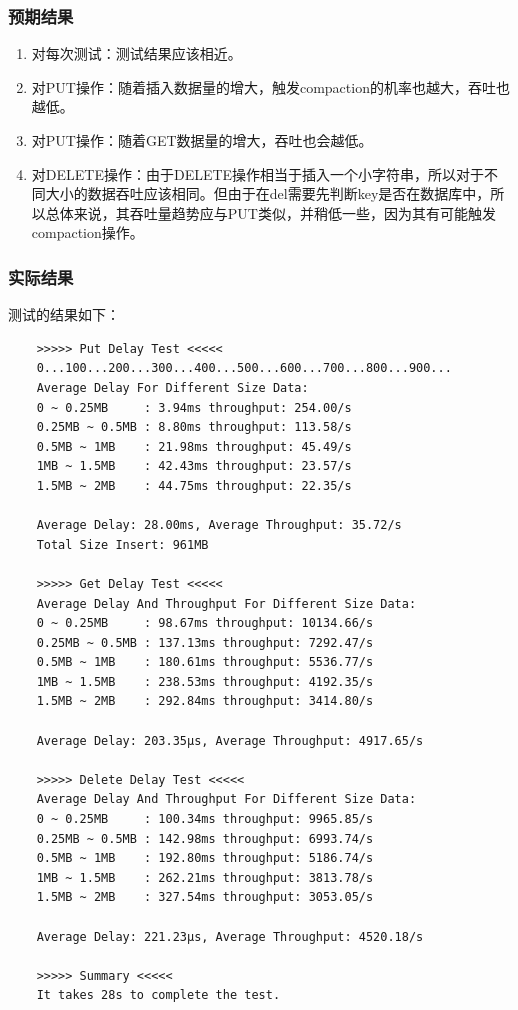 \documentclass{ctexart}
\begin{document}
\subsubsection{预期结果}
\begin{enumerate}
  \item 对每次测试：测试结果应该相近。
  \item 对PUT操作：随着插入数据量的增大，触发compaction的机率也越大，吞吐也越低。
  \item 对PUT操作：随着GET数据量的增大，吞吐也会越低。
  \item 对DELETE操作：由于DELETE操作相当于插入一个小字符串，所以对于不同大小的数据吞吐应该相同。但由于在del需要先判断key是否在数据库中，所以总体来说，其吞吐量趋势应与PUT类似，并稍低一些，因为其有可能触发compaction操作。
\end{enumerate}

\subsubsection{实际结果}
测试的结果如下：
\begin{verbatim}
    >>>>> Put Delay Test <<<<<
    0...100...200...300...400...500...600...700...800...900...
    Average Delay For Different Size Data:
    0 ~ 0.25MB     : 3.94ms throughput: 254.00/s
    0.25MB ~ 0.5MB : 8.80ms throughput: 113.58/s
    0.5MB ~ 1MB    : 21.98ms throughput: 45.49/s
    1MB ~ 1.5MB    : 42.43ms throughput: 23.57/s
    1.5MB ~ 2MB    : 44.75ms throughput: 22.35/s
    
    Average Delay: 28.00ms, Average Throughput: 35.72/s
    Total Size Insert: 961MB
    
    >>>>> Get Delay Test <<<<<
    Average Delay And Throughput For Different Size Data:
    0 ~ 0.25MB     : 98.67ms throughput: 10134.66/s
    0.25MB ~ 0.5MB : 137.13ms throughput: 7292.47/s
    0.5MB ~ 1MB    : 180.61ms throughput: 5536.77/s
    1MB ~ 1.5MB    : 238.53ms throughput: 4192.35/s
    1.5MB ~ 2MB    : 292.84ms throughput: 3414.80/s
    
    Average Delay: 203.35µs, Average Throughput: 4917.65/s
    
    >>>>> Delete Delay Test <<<<<
    Average Delay And Throughput For Different Size Data:
    0 ~ 0.25MB     : 100.34ms throughput: 9965.85/s
    0.25MB ~ 0.5MB : 142.98ms throughput: 6993.74/s
    0.5MB ~ 1MB    : 192.80ms throughput: 5186.74/s
    1MB ~ 1.5MB    : 262.21ms throughput: 3813.78/s
    1.5MB ~ 2MB    : 327.54ms throughput: 3053.05/s
    
    Average Delay: 221.23µs, Average Throughput: 4520.18/s
    
    >>>>> Summary <<<<<
    It takes 28s to complete the test.
\end{verbatim}
\end{document}
